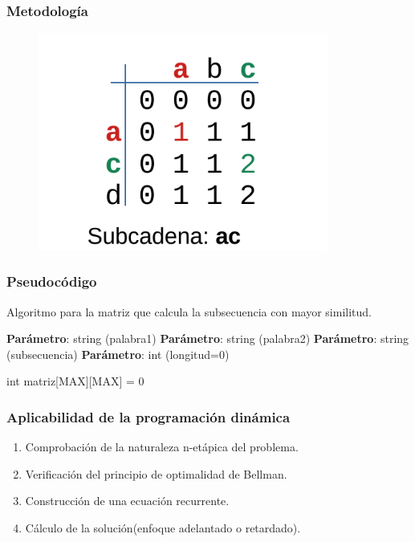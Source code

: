 \documentclass[13pt]{beamer}
\begin{document}
    \begin{frame}
        \frametitle{Metodología}
        \begin{figure}[H] 
            \centering
            \includegraphics[width=0.85\textwidth]{dibujito.pdf}
        \end{figure}
    \end{frame}



    \begin{frame}
        \frametitle{Pseudocódigo}
    
        \begin{algorithm}[H]
            \caption{Algoritmo para la matriz que calcula la subsecuencia con mayor similitud.}\label{alg:simil}
            \begin{minipage}{0.92\textwidth}
            \textbf{Parámetro}: string (palabra1)
            \textbf{Parámetro}: string (palabra2)
            \textbf{Parámetro}: string (subsecuencia)
            \textbf{Parámetro}: int (longitud=0)
            \end{minipage}

            int matriz[MAX][MAX] = {0}

             {
                 {
                }
            }
        \end{algorithm}
    \end{frame}

    \begin{frame}
		\frametitle{Aplicabilidad de la programación dinámica}
        \begin{enumerate}
            \item Comprobación de la naturaleza n-etápica del problema. 
            \item Verificación del principio de optimalidad de Bellman. 
            \item Construcción de una ecuación recurrente. 
            \item Cálculo de la solución(enfoque adelantado o retardado). 
        \end{enumerate}
	\end{frame}
\end{document}
